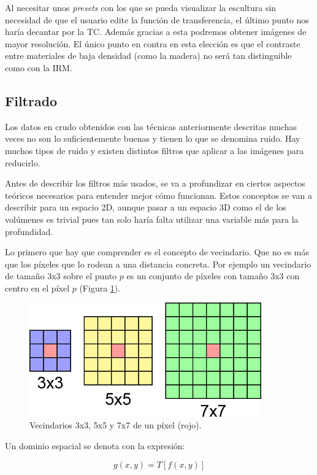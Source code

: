 Al necesitar unos \textit{presets} con los que se pueda visualizar la escultura sin necesidad de que el usuario edite la función de transferencia, el último punto nos haría decantar por la TC. Además gracias a esta podremos obtener imágenes de mayor resolución. El único punto en contra en esta elección es que el contraste entre materiales de baja densidad (como la madera) no será tan distinguible como con la IRM.

\subsection{Filtrado}

Los datos en crudo obtenidos con las técnicas anteriormente descritas muchas veces no son lo suficientemente buenas y tienen lo que se denomina ruido. Hay muchos tipos de ruido y existen distintos filtros que aplicar a las imágenes para reducirlo.

Antes de describir los filtros más usados, se va a profundizar en ciertos aspectos teóricos necesarios para entender mejor cómo funcionan. Estos conceptos se van a describir para un espacio 2D, aunque pasar a un espacio 3D como el de los volúmenes es trivial pues tan solo haría falta utilizar una variable más para la profundidad.

Lo primero que hay que comprender es el concepto de vecindario. Que no es más que los píxeles que lo rodean a una distancia concreta. Por ejemplo un vecindario de tamaño 3x3 sobre el punto $p$ es un conjunto de píxeles con tamaño 3x3 con centro en el píxel $p$ (Figura \ref{fig:desarrollo/vecindario}).

\begin{figure}[H]
	\centering
	\includegraphics[width=10cm]{imagenes/desarrollo/vecindario}
	\caption{Vecindarios 3x3, 5x5 y 7x7 de un píxel (rojo).}
	\label{fig:desarrollo/vecindario}
\end{figure}

Un dominio espacial se denota con la expresión:

\[ g(x, y) = T[f(x, y)] \]

